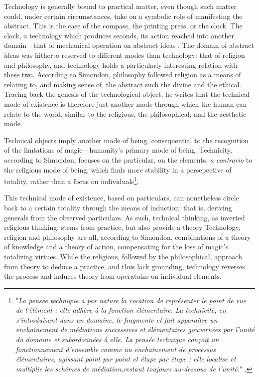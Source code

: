 Technology is generally bound to practical matter, even though such matter could, under certain circumstances, take on a symbolic role of manifesting the abstract. This is the case of the compass, the printing press, or the clock. The clock, a technology which produces seconds, its action reached into another domain—that of mechanical operation on abstract ideas \citep{mumford_technics_1934}. The domain of abstract ideas was hitherto reserved to different modes than technology: that of religion and philosophy, and technology holds a particularly interesting relation with these two. According to Simondon, philosophy followed religion as a means of relating to, and making sense of, the abstract such the divine and the ethical. Tracing back the genesis of the technological object, he writes that the technical mode of existence is therefore just another mode through which the human can relate to the world, similar to the religious, the philosophical, and the aesthetic mode\citep{simondon_mode_1958}.

Technical objects imply another mode of being, consequential to the recognition of the limtations of magic—humanity's primary mode of being. Technicity, according to Simondon, focuses on the particular, on the elements, \emph{a contrario} to the religious mode of being, which finds more stability in a persepective of totality, rather than a focus on individuals\footnote{"\emph{La pensée technique a par nature la vocation de représenter le point de vue de l'élément ; elle adhère à la fonction élémentaire. La technicité, en s'introduisant dans un domaine, le fragmente et fait apparaître un enchaînement de médiations successives et élémentaires gouvernées par l'unité du domaine et subordonnées à elle. La pensée technique conçoit un fonctionnement d'ensemble comme un enchaînement de processus élémentaires, agissant point par point et étape par étape ; elle localise et multiplie les schèmes de médiation,restant toujours au-dessous de l'unité.}" \citep{simondon_mode_1958}.}.

This technical mode of existence, based on particulars, can nonetheless circle back to a certain totality through the means of induction; that is, deriving generals from the observed particulars. As such, technical thinking, as inverted religious thinking, stems from practice, but also provide a theory Technology, religion and philosophy are all, according to Simondon, combinations of a theory of knowledge and a theory of action, compensating for the loss of magic's totalizing virtues. While the religious, followed by the philosophical, approach from theory to deduce a practice, and thus lack grounding, technology reverses the process and induces theory from operatoins on individual elements.


